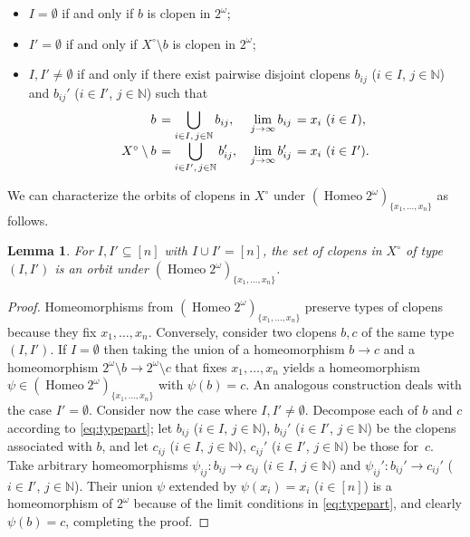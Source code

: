 \documentclass[12pt,a4paper,reqno]{amsart}
\numberwithin{equation}{section}
\theoremstyle{plain}
\newtheorem{lem}[thm]{Lemma}
\theoremstyle{definition}
\newcommand{\N}{\mathbb{N}}
\DeclareMathOperator{\Homeo}{Homeo}
\begin{document}
\begin{itemize}
\item
$I=\emptyset$ if and only if $b$ is clopen in $2^\omega$;
\item
$I'=\emptyset$ if and only if $X^\circ\setminus b$ is clopen in $2^\omega$;
\item
$I,I'\neq\emptyset$ if and only if there exist pairwise disjoint clopens $b_{ij}$ ($i\in I$, $j\in\N$) and $b_{ij}'$ ($i\in I'$, $j\in\N$) such that
\begin{equation}
\label{eq:typepart}
\setlength{\arraycolsep}{2pt}
\begin{array}{rlrl}
b&=\displaystyle\bigcup_{i\in I,\,j\in\N} b_{ij},\quad & \displaystyle\lim_{j\to \infty} b_{ij}&=x_i\ (i\in I),\\
X^\circ\setminus b&=\displaystyle\bigcup_{i\in I',\,j\in\N} b_{ij}',&\displaystyle\lim_{j\to \infty} b_{ij}'&=x_i\ (i\in I').
\end{array}
\end{equation}
\end{itemize}

 We can characterize the orbits of clopens in $X^\circ$ under $(\Homeo 2^\omega)_{\{x_1,\dots,x_n\}}$ as follows.

\begin{lem} \label{lem:types}
 For $I,I'\subseteq [n]$ with $I\cup I'=[n]$, the set of clopens in $X^\circ$ of type $(I,I')$ is an orbit under
 $(\Homeo 2^\omega)_{\{x_1,\dots,x_n\}}$.  
\end{lem}

\begin{proof}
Homeomorphisms from $(\Homeo 2^\omega)_{\{x_1,\dots,x_n\}}$ preserve types of clo\-pens because they fix $x_1,\dots,x_n$.
Conversely, consider two clopens $b,c$ of the same type $(I,I')$.
If $I=\emptyset$ then taking the union of a homeomorphism $b\to c$ and a homeomorphism $2^\omega\setminus b\to 2^\omega\setminus c$ that fixes $x_1,\dots,x_n$ yields a homeomorphism $\psi \in (\Homeo 2^\omega)_{\{x_1,\dots,x_n\}}$ with $\psi(b)=c$.
An analogous construction deals with the case $I'=\emptyset$.
Consider now the case where $I,I'\neq \emptyset$. Decompose each of $b$ and $c$ according to \eqref{eq:typepart};
let
$b_{ij}$ ($i\in I$, $j\in \N$), $b_{ij}'$ ($i\in I'$, $j\in \N$) be the clopens associated with $b$, and let
$c_{ij}$ ($i\in I$, $j\in \N$), $c_{ij}'$ ($i\in I'$, $j\in \N$) be those for~$c$.
Take arbitrary homeomorphisms $\psi_{ij}\colon b_{ij}\to c_{ij}$ ($i\in I$, $j\in\N$) and
$\psi_{ij}'\colon b_{ij}'\to c_{ij}'$ ($i\in I'$, $j\in\N$).
Their union $\psi$ extended by $\psi(x_i)=x_i$ ($i\in [n]$) is a homeomorphism of $2^\omega$ because of the limit
conditions in \eqref{eq:typepart}, and clearly $\psi(b)=c$, completing the proof.
\end{proof}
\end{document}

